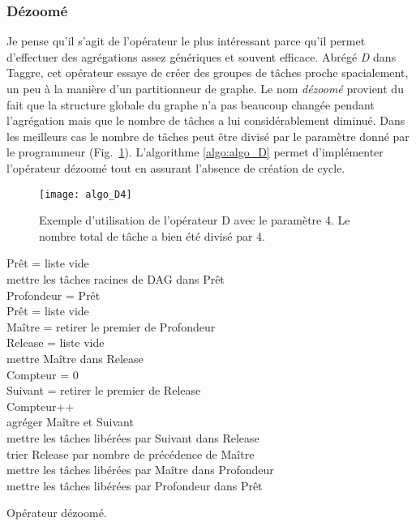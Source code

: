 \subsubsection{Dézoomé}
Je pense qu'il s'agit de l'opérateur le plus intéressant parce qu'il permet d'effectuer des agrégations assez génériques et souvent efficace.
%
Abrégé {\em D} dans Taggre, cet opérateur essaye de créer des groupes de tâches proche spacialement, un peu à la manière d'un partitionneur de graphe.
%
Le nom {\em dézoomé} provient du fait que la structure globale du graphe n'a pas beaucoup changée pendant l'agrégation mais que le nombre de tâches a lui considérablement diminué.
%
Dans les meilleurs cas le nombre de tâches peut être divisé par le paramètre donné par le programmeur (Fig.~\ref{fig:algo_D4}).
%
L'algorithme \ref{algo:algo_D} permet d'implémenter l'opérateur dézoomé tout en assurant l'absence de création de cycle.
\begin{figure}[t!]
  \centering
  \texttt{[image: algo\_D4]}
  \caption{Exemple d'utilisation de l'opérateur D avec le paramètre 4. Le nombre total de tâche a bien été divisé par 4.}
  \label{fig:algo_D4}
\end{figure}

\begin{algorithm}
  {\sc Prêt} = liste vide \\
  mettre les tâches racines de DAG dans {\sc Prêt} \\
   {
    {\sc Profondeur} = {\sc Prêt} \\
    {\sc Prêt} = liste vide \\
     {
      {\sc Maître} = retirer le premier de {\sc Profondeur} \\
      {\sc Release} = liste vide \\
      mettre {\sc Maître} dans {\sc Release} \\
      {\sc Compteur} = 0 \\
       {
        {\sc Suivant} = retirer le premier de {\sc Release} \\
        {\sc Compteur}++\\
        agréger {\sc Maître} et {\sc Suivant}\\
        mettre les tâches libérées par {\sc Suivant} dans {\sc Release} \\
        trier {\sc Release} par nombre de précédence de {\sc Maître} \\
      }
      mettre les tâches libérées par {\sc Maître} dans {\sc Profondeur} \\
    }
    mettre les tâches libérées par {\sc Profondeur} dans {\sc Prêt}\\
  }
  \label{algo:algo_D}
  \caption{Opérateur dézoomé.}
\end{algorithm}
